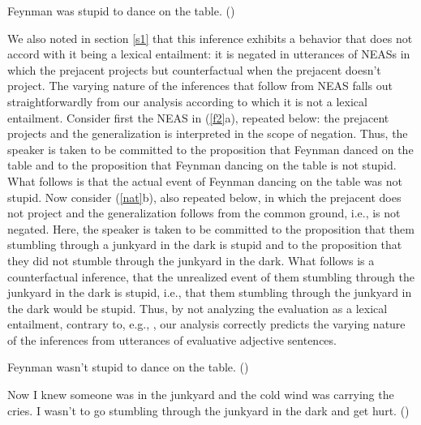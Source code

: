 \documentclass[11pt,fleqn]{article}
\newcommand{\6}{\mbox{$[\hspace*{-.6mm}[$}}
\newcommand{\9}{\mbox{$]\hspace*{-.6mm}]$}}
\begin{document}
\begin{exe} 
\exi{(\ref{f})} Feynman was stupid to dance on the table. \hfill (\citealt[18]{barker02})

\end{exe} 
We also noted in section \ref{s1} that this inference exhibits a behavior that does not accord with it being a lexical entailment: it is negated in utterances of NEASs in which the prejacent projects but counterfactual when the prejacent doesn't project. The varying nature of the inferences that follow from NEAS falls out straightforwardly from our analysis according to which it is not a lexical entailment. Consider first the NEAS in  (\ref{f2}a), repeated below: the prejacent projects and the generalization is interpreted in the scope of negation. Thus, the speaker is taken to be committed to the proposition that Feynman danced on the table and to the proposition that Feynman dancing on the table is not stupid. What follows is that the actual event of Feynman dancing on the table was not stupid. Now consider (\ref{nat}b), also repeated below, in which the prejacent does not project and the generalization follows from the common ground, i.e., is not negated. Here, the speaker is taken to be committed to the proposition that them stumbling through a junkyard in the dark is stupid and to the proposition that they did not stumble through the junkyard in the dark. What follows is a counterfactual inference, that the unrealized event of them stumbling through the junkyard in the dark is stupid, i.e., that them stumbling through the junkyard in the dark would be stupid. Thus, by not analyzing the evaluation as a lexical entailment, contrary to, e.g., \citealt{barker02}, our analysis correctly predicts the varying nature of the inferences from utterances of evaluative adjective sentences.

\begin{exe}
 Feynman wasn't stupid to dance on the table. \hfill (\citealt[18f.]{barker02})

 Now I knew someone was in the junkyard and the cold wind was
carrying the cries. I wasn't  to go stumbling through the
junkyard in the dark and get hurt. \hfill (\citealt[235]{karttunen-etal2014})

\end{exe}
\end{document}
